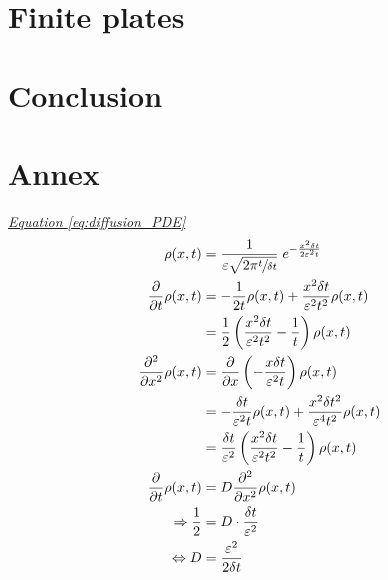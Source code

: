 \documentclass[a4paper, parskip=half]{scrartcl}
\newcommand{\myEqRef}[1]{\textit{\hyperref[eq:#1]{Equation \ref*{eq:#1}}}}
\begin{document}
\newpage
\section{Finite plates}

\newpage
\section{Conclusion}

\newpage
\section{Annex}
\myEqRef{diffusion_PDE}
\begin{align}
\rho(x,t) &= \frac{1}{\varepsilon\sqrt{2\pi\sfrac{t}{\delta t}}}\; e^{-\frac{x^2 \delta t}{2 \varepsilon^2 t}} \\
\frac{\partial}{\partial t} \rho(x,t) &= - \frac{1}{2t} \rho(x,t) + \frac{x^2 \delta t}{\varepsilon^2t^2} \rho(x,t) \\
&= \frac{1}{2} \left(\frac{x^2 \delta t}{\varepsilon^2t^2} - \frac{1}{t} \right)\rho(x,t) \\
\frac{\partial^2}{\partial x^2} \rho(x,t) &= \frac{\partial}{\partial x} \left(-\frac{x\delta t}{\varepsilon^2t} \right) \rho(x,t) \\
&= -\frac{\delta t}{\varepsilon^2t} \rho(x,t) + \frac{x^2\delta t^2}{\varepsilon^4 t^2} \rho(x,t) \\
&= \frac{\delta t}{\varepsilon^2}\left(\frac{x^2 \delta t}{\varepsilon^2 t^2} - \frac{1}{t}\right) \rho(x,t) \\
\frac{\partial}{\partial t} \rho(x,t) &= D \frac{\partial^2}{\partial x^2 } \rho(x,t)\\
\Rightarrow \frac{1}{2} &= D \cdot \frac{\delta t}{\varepsilon^2}\\
\Leftrightarrow D &= \frac{\varepsilon^2}{2\delta t}
\end{align}
\end{document}
